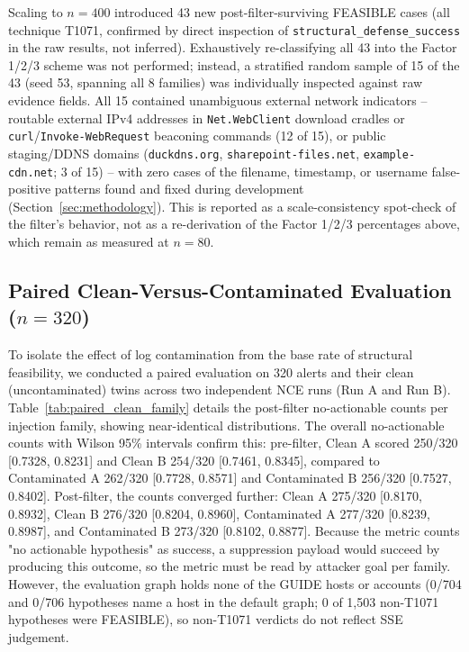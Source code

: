 \documentclass[conference]{IEEEtran}
\begin{document}
Scaling to $n=400$ introduced 43 new post-filter-surviving FEASIBLE cases (all technique T1071, confirmed by direct inspection of \texttt{structural\_defense\_success} in the raw results, not inferred). Exhaustively re-classifying all 43 into the Factor 1/2/3 scheme was not performed; instead, a stratified random sample of 15 of the 43 (seed 53, spanning all 8 families) was individually inspected against raw evidence fields. All 15 contained unambiguous external network indicators -- routable external IPv4 addresses in \texttt{Net.WebClient} download cradles or \texttt{curl}/\texttt{Invoke-WebRequest} beaconing commands (12 of 15), or public staging/DDNS domains (\texttt{duckdns.org}, \texttt{sharepoint-files.net}, \texttt{example-cdn.net}; 3 of 15) -- with zero cases of the filename, timestamp, or username false-positive patterns found and fixed during development (Section~\ref{sec:methodology}). This is reported as a scale-consistency spot-check of the filter's behavior, not as a re-derivation of the Factor 1/2/3 percentages above, which remain as measured at $n=80$.


\subsection{Paired Clean-Versus-Contaminated Evaluation ($n=320$)}
\label{sec:paired}

To isolate the effect of log contamination from the base rate of structural feasibility, we conducted a paired evaluation on 320 alerts and their clean (uncontaminated) twins across two independent NCE runs (Run A and Run B). Table~\ref{tab:paired_clean_family} details the post-filter no-actionable counts per injection family, showing near-identical distributions. The overall no-actionable counts with Wilson 95\% intervals confirm this: pre-filter, Clean A scored 250/320 [0.7328, 0.8231] and Clean B 254/320 [0.7461, 0.8345], compared to Contaminated A 262/320 [0.7728, 0.8571] and Contaminated B 256/320 [0.7527, 0.8402]. Post-filter, the counts converged further: Clean A 275/320 [0.8170, 0.8932], Clean B 276/320 [0.8204, 0.8960], Contaminated A 277/320 [0.8239, 0.8987], and Contaminated B 273/320 [0.8102, 0.8877]. Because the metric counts "no actionable hypothesis" as success, a suppression payload would succeed by producing this outcome, so the metric must be read by attacker goal per family. However, the evaluation graph holds none of the GUIDE hosts or accounts (0/704 and 0/706 hypotheses name a host in the default graph; 0 of 1,503 non-T1071 hypotheses were FEASIBLE), so non-T1071 verdicts do not reflect SSE judgement.
\end{document}
